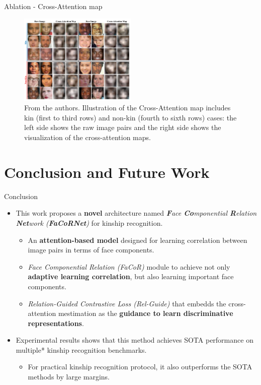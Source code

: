 \documentclass[aspectratio=169,xcolor=dvipsnames]{beamer}
\begin{document}

\begin{frame}{Ablation - Cross-Attention map}
    \begin{figure}
        \centering
        \includegraphics[width=0.5\textwidth]{imgs/F4.png}
        \caption{From the authors. Illustration of the Cross-Attention map includes kin (first to third rows) and non-kin (fourth to sixth rows) cases: the left side shows the raw image pairs and the right side shows the visualization of the cross-attention maps.}
        \label{fig:results-f4}
    \end{figure}
\end{frame}

\section{Conclusion and Future Work}
\begin{frame}{Conclusion}
    \begin{itemize}
        \item This work proposes a \textbf{novel} architecture named \textit{\textbf{F}ace \textbf{Co}mponential \textbf{R}elation \textbf{Net}work (\textbf{FaCoRNet})} for kinship recognition.
            \begin{itemize}
                \item An \textbf{attention-based model} designed for learning correlation between image pairs in terms of face components.
                \item \textit{Face Componential Relation (FaCoR)} module to achieve not only \textbf{adaptive learning correlation}, but also learning important face components.
                \item \textit{Relation-Guided Contrastive Loss (Rel-Guide)} that embedds the cross-attention mestimation as the \textbf{guidance to learn discriminative representations}.
            \end{itemize}
        \item Experimental results shows that this method achieves SOTA performance on multiple* kinship recognition benchmarks.
            \begin{itemize}
                \item For practical kinship recognition protocol, it also outperforms the SOTA methods by large margins.
            \end{itemize}
    \end{itemize}
\end{frame}
\end{document}
